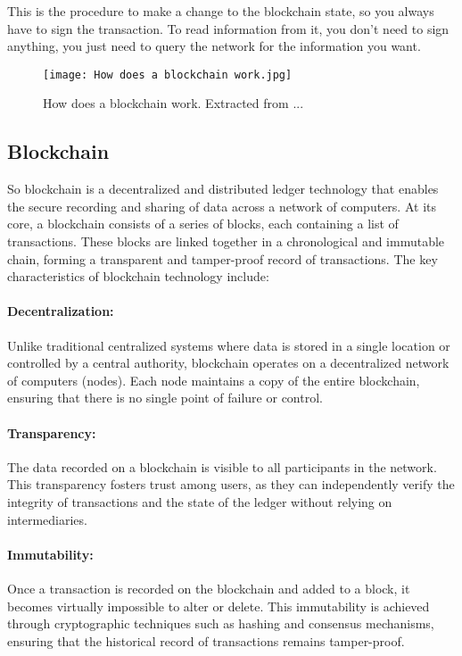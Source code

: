 This is the procedure to make a change to the blockchain state, so you always
have to sign the transaction. To read information from it, you don't need to
sign anything, you just need to query the network for the information you want.

\begin{figure}[H]
    \texttt{[image: How does a blockchain work.jpg]}
    \centering
    \caption[How does a blockchain work]{How does a blockchain work. Extracted from ...}
    \label{fig:how_does_a_blockchain_work}
\end{figure}

\subsection{Blockchain}
\label{subsec:blockchain}

So blockchain is a decentralized and distributed ledger technology that enables
the secure recording and sharing of data across a network of computers. At its
core, a blockchain consists of a series of blocks, each containing a list of
transactions. These blocks are linked together in a chronological and immutable
chain, forming a transparent and tamper-proof record of transactions. The key
characteristics of blockchain technology include:

\paragraph{Decentralization:}
Unlike traditional centralized systems where data is stored in a single
location or controlled by a central authority, blockchain operates on a
decentralized network of computers (nodes). Each node maintains a copy of the
entire blockchain, ensuring that there is no single point of failure or
control.

\paragraph{Transparency:}
The data recorded on a blockchain is visible to all participants in the
network. This transparency fosters trust among users, as they can independently
verify the integrity of transactions and the state of the ledger without
relying on intermediaries.

\paragraph{Immutability:}
Once a transaction is recorded on the blockchain and added to a block, it
becomes virtually impossible to alter or delete. This immutability is achieved
through cryptographic techniques such as hashing and consensus mechanisms,
ensuring that the historical record of transactions remains tamper-proof.

